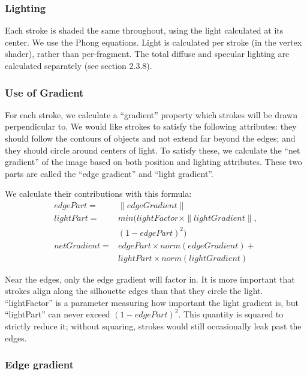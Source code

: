 \documentclass[conference]{acmsiggraph}
\begin{document}
\subsubsection{Lighting}

Each stroke is shaded the same throughout, using the light calculated at its
center. We use the Phong equations. Light is calculated per stroke (in the
vertex shader), rather than per-fragment. The total diffuse and specular
lighting are calculated separately (see section 2.3.8).


\subsubsection{Use of Gradient}

For each stroke, we calculate a ``gradient'' property which strokes will be
drawn perpendicular to. We would like strokes to satisfy the following
attributes: they should follow the contours of objects and not extend far
beyond the edges; and they should circle around centers of light. To satisfy
these, we calculate the ``net gradient'' of the image based on both position
and lighting attributes. These two parts are called the ``edge gradient'' and
``light gradient''.

We calculate their contributions with this formula:
\begin{align*}
  edgePart = &\| edgeGradient \| \\
  lightPart = &min(lightFactor \times \| lightGradient \| , \\
              &(1 - edgePart)^2) \\
  netGradient = &edgePart \times norm(edgeGradient) +\\
                &lightPart \times norm(lightGradient)
\end{align*}

Near the edges, only the edge gradient will factor in. It is more important
that strokes align along the silhouette edges than that they circle the light.
``lightFactor'' is a parameter measuring how important the light gradient is,
but ``lightPart'' can never exceed $(1 - edgePart)^2$. This quantity is squared
to strictly reduce it; without squaring, strokes would still occasionally leak
past the edges.


\subsubsection{Edge gradient}
\end{document}
